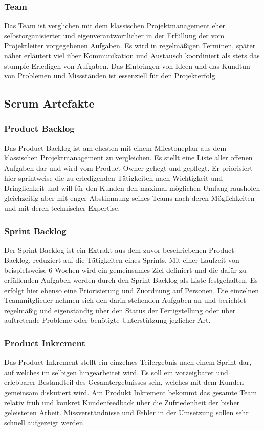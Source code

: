 \subsubsection{Team}
Das Team ist verglichen mit dem klassischen Projektmanagement eher selbstorganisierter und eigenverantwortlicher in der Erfüllung der vom Projektleiter vorgegebenen Aufgaben. Es wird in regelmäßigen Terminen, später näher erläutert viel über Kommunikation und Austausch koordiniert als stets das stumpfe Erledigen von Aufgaben. Das Einbringen von Ideen und das Kundtun von Problemen und Missständen ist essenziell für den Projekterfolg. 


\subsection{Scrum Artefakte}
\subsubsection{Product Backlog}
Das Product Backlog ist am ehesten mit einem Milestoneplan aus dem klassischen Projektmanagement zu vergleichen. Es stellt eine Liste aller offenen Aufgaben dar und wird vom Product Owner gehegt und gepflegt. Er priorisiert hier sprintweise die zu erledigenden Tätigkeiten nach Wichtigkeit und Dringlichkeit und will für den Kunden den maximal möglichen Umfang rausholen gleichzeitig aber mit enger Abstimmung seines Teams nach deren Möglichkeiten und mit deren technischer Expertise.

\subsubsection{Sprint Backlog}
Der Sprint Backlog ist ein Extrakt aus dem zuvor beschriebenen Product Backlog, reduziert auf die Tätigkeiten eines Sprints. Mit einer Laufzeit von beispielsweise 6 Wochen wird ein gemeinsames Ziel definiert und die dafür zu erfüllenden Aufgaben werden durch den Sprint Backlog als Liste festgehalten. Es erfolgt hier ebenso eine Priorisierung und Zuordnung auf Personen. Die einzelnen Teammitglieder nehmen sich den darin stehenden Aufgaben an und berichtet regelmäßig und eigenständig über den Status der Fertigstellung oder über auftretende Probleme oder benötigte Unterstützung jeglicher Art.

\subsubsection{Product Inkrement}
Das Product Inkrement stellt ein einzelnes Teilergebnis nach einem Sprint dar, auf welches im selbigen hingearbeitet wird. Es soll ein vorzeigbarer und erlebbarer Bestandteil des Gesamtergebnisses sein, welches mit dem Kunden gemeinsam diskutiert wird. Am Produkt Inkrement bekommt das gesamte Team relativ früh und konkret Kundenfeedback über die Zufriedenheit der bisher geleisteten Arbeit. Missverständnisse und Fehler in der Umsetzung sollen sehr schnell aufgezeigt werden.


